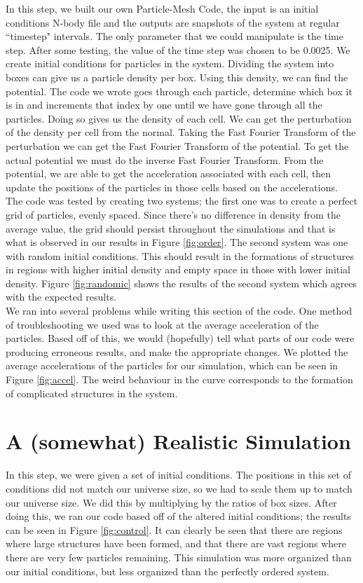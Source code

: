 \documentclass[10pt]{article}
\begin{document}
	In this step, we built our own Particle-Mesh Code, the input is an initial conditions N-body file and the outputs are snapshots of the system at regular ``timestep" intervals. The only parameter that we could manipulate is the time step. After some testing, the value of the time step was chosen to be 0.0025. We create initial conditions for particles in the system. Dividing the system into boxes can give us a particle density per box. Using this density, we can find the potential. The code we wrote goes through each particle, determine which box it is in and increments that index by one until we have gone through all the particles. Doing so gives us the density of each cell. We can get the perturbation of the density per cell from the normal. Taking the Fast Fourier Transform of the perturbation we can get the Fast Fourier Transform of the potential. To get the actual potential we must do the inverse Fast Fourier Transform. From the potential, we are able to get the acceleration associated with each cell, then update the positions of the particles in those cells based on the accelerations.\\ 
	The code was tested by creating two systems; the first one was to create a perfect grid of particles, evenly spaced. Since there’s no difference in density from the average value, the grid should persist throughout the simulations and that is what is observed in our results in Figure \ref{fig:order}{}. The second system was one with random initial conditions. This should result in the formations of structures in regions with higher initial density and empty space in those with lower initial density. Figure \ref{fig:randomic}{} shows the results of the second system which agrees with the expected results.\\
	We ran into several problems while writing this section of the code. One method of troubleshooting we used was to look at the average acceleration of the particles. Based off of this, we would (hopefully) tell what parts of our code were producing erroneous results, and make the appropriate changes. We plotted the average accelerations of the particles for our simulation, which can be seen in Figure \ref{fig:accel}{}. The weird behaviour in the curve corresponds to the formation of complicated structures in the system.




\section{A (somewhat) Realistic Simulation}
	In this step, we were given a set of initial conditions. The positions in this set of conditions did not match our universe size, so we had to scale them up to match our universe size. We did this by multiplying by the ratios of box sizes. After doing this, we ran our code based off of the altered initial conditions; the results can be seen in Figure \ref{fig:control}{}. It can clearly be seen that there are regions where large structures have been formed, and that there are vast regions where there are very few particles remaining.
	This simulation was more organized than our initial conditions, but less organized than the perfectly ordered system.
	
\end{document}
